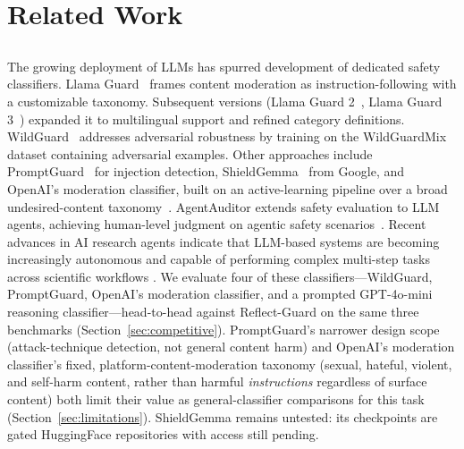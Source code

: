 \documentclass[superintelligence,article,accept,moreauthors]{Definitions/mdpi}
\begin{document}
\section{Related Work}

\subsection{ %
}
The growing deployment of LLMs has spurred development of dedicated safety classifiers. Llama Guard~\citep{inan2023llamaguard} frames content moderation as instruction-following with a customizable taxonomy. Subsequent versions (Llama Guard 2~\citep{metallamaguard2}, Llama Guard 3~\citep{metallamaguard3}) expanded it to multilingual support and refined category definitions. WildGuard~\citep{han2024wildguard} addresses adversarial robustness by training on the WildGuardMix dataset containing adversarial examples. Other approaches include PromptGuard~\citep{meta2024promptguard} for injection detection, ShieldGemma~\citep{zeng2024shieldgemma} from Google, and OpenAI's moderation classifier, built on an active-learning pipeline over a broad undesired-content taxonomy~\citep{markov2023holistic}. AgentAuditor extends safety evaluation to LLM agents, achieving human-level judgment on agentic safety \mbox{scenarios~\citep{luo2025agentauditor}.} Recent advances in AI research agents indicate that LLM-based systems are becoming increasingly autonomous and capable of performing complex multi-step tasks across scientific workflows \citep{kong2026aiautoresearch}. We evaluate four of these classifiers---WildGuard, PromptGuard, OpenAI's moderation classifier, and a prompted GPT-4o-mini reasoning classifier---head-to-head against Reflect-Guard on the same three benchmarks (Section~\ref{sec:competitive}). PromptGuard's narrower design scope (attack-technique detection, not general content harm) and OpenAI's moderation classifier's fixed, platform-content-moderation taxonomy (sexual, hateful, violent, and self-harm content, rather than harmful \emph{instructions} regardless of surface content) both limit their value as general-classifier comparisons for this task (Section~\ref{sec:limitations}). ShieldGemma remains untested: its checkpoints are gated HuggingFace repositories with access still pending.
\end{document}
